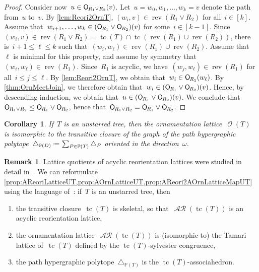 \documentclass{amsart}
\newtheorem{corollary}[theorem]{Corollary}
\theoremstyle{definition}
\newtheorem{remark}[theorem]{Remark}
\renewcommand{\c}[1]{\mathcal{#1}} %
\newcommand{\eqdef}{\mbox{\,\raisebox{0.2ex}{\scriptsize\ensuremath{\mathrm:}}\ensuremath{=}\,}} %
\newcommand{\simplex}{\triangle} %
\DeclareMathOperator{\tc}{tc} %
\newcommand{\join}{\vee} %
\newcommand{\mymap}[2]{\mathsf{#1}_{\hspace{-.7pt}#2}}
\DeclareMathOperator{\Orn}{\c{O}}  %
\newcommand{\orn}[1]{\mymap{O}{#1}}  %
\DeclareMathOperator{\AReori}{\c{AR}}  %
\DeclareMathOperator{\rev}{rev} %
\newcommand{\PP}{\mathbb P} %
\begin{document}
\begin{proof}
Consider now~$u \in \orn{R_1 \join R_2}(v)$.
Let~$u = w_0, w_1, \dots, w_k = v$ denote the path from~$u$ to~$v$.
By \cref{lem:Reori2OrnT}, $(w_i, v) \in \rev(R_1 \join R_2)$ for all~$i \in [k]$.
Assume that~$w_{i+1}, \dots, w_k \in (\orn{R_1} \join \orn{R_2})(v)$ for some~$i \in [k-1]$.
Since~$(w_i, v) \in \rev(R_1 \join R_2) = \tc(T) \cap \tc(\rev(R_1) \cup \rev(R_2))$, there is~${i+1 \le \ell \le k}$ such that~$(w_i, w_\ell) \in \rev(R_1) \cup \rev(R_2)$.
Assume that~$\ell$ is minimal for this property, and assume by symmetry that~$(w_i, w_\ell) \in \rev(R_1)$.
Since~$R_1$ is acyclic, we have~$(w_j, w_\ell) \in \rev(R_1)$ for all~${i \le j \le \ell}$.
By \cref{lem:Reori2OrnT}, we obtain that~$w_i \in \orn{R_1}(w_\ell)$.
By \cref{thm:OrnMeetJoin}, we therefore obtain that~${w_i \in (\orn{R_1} \join \orn{R_2})(v)}$.
Hence, by descending induction, we obtain that~$u \in (\orn{R_1} \join \orn{R_2})(v)$.
We conclude that~$\orn{R_1 \join R_2} \le \orn{R_1} \join \orn{R_2}$, hence that~${\orn{R_1 \join R_2} = \orn{R_1} \join \orn{R_2}}$.
\end{proof}

\begin{corollary}
If~$T$ is an unstarred tree, then the ornamentation lattice~$\Orn(T)$ is isomorphic to the transitive closure of the graph of the path hypergraphic polytope~$\simplex_{\PP(D)} \eqdef \sum_{P \in \PP(T)} \simplex_P$ oriented in the direction~$\omega$.
\end{corollary}

\begin{remark}
Lattice quotients of acyclic reorientation lattices were studied in detail in~\cite{Pilaud-acyclicReorientationLattices}.
We can reformulate \cref{prop:AReoriLatticeUT,prop:AOrnLatticeUT,prop:AReori2AOrnLatticeMapUT} using the language of~\cite{Pilaud-acyclicReorientationLattices}: if~$T$ is an unstarred tree, then
\begin{enumerate}
\item the transitive closure~$\tc(T)$ is skeletal, so that~$\AReori(\tc(T))$ is an acyclic reorientation lattice,
\item the ornamentation lattice~$\AReori(\tc(T))$ is (isomorphic to) the Tamari lattice of~$\tc(T)$ defined by the $\tc(T)$-sylvester congruence,
\item the path hypergraphic polytope~$\simplex_{\PP(T)}$ is the $\tc(T)$-associahedron.
\end{enumerate}
\end{remark}
\end{document}
